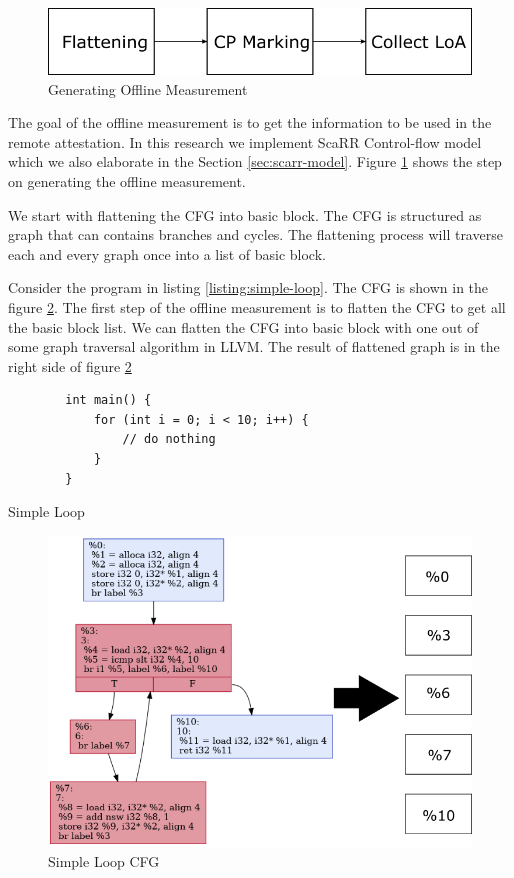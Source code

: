 \begin{figure}[htbp]
\centerline{\includegraphics[scale=.75]{Figures/04/scarr-overview.png}}
\caption{Generating Offline Measurement}
\label{fig:scarr-overview}
\end{figure}

The goal of the offline measurement is to get the information to be used in the
remote attestation. In this research we implement ScaRR Control-flow model
\cite{toffaliniScaRRScalableRuntime2019} which we also elaborate in the Section
\ref{sec:scarr-model}. Figure \ref{fig:scarr-overview} shows the step on
generating the offline measurement.

We start with flattening the CFG into basic block. The CFG is structured as
graph that can contains branches and cycles. The flattening process will
traverse each and every graph once into a list of basic block. 

Consider the program in listing \ref{listing:simple-loop}. The CFG is shown in
the figure \ref{fig:simple-loop-cfg}. The first step of the offline measurement
is to flatten the CFG to get all the basic block list. We can flatten the CFG
into basic block with one out of some graph traversal algorithm in LLVM. The
result of flattened graph is in the right side of figure
\ref{fig:simple-loop-cfg}

\begin{listing}[htbp]
    \begin{verbatim}
        int main() {
            for (int i = 0; i < 10; i++) {
                // do nothing
            }
        }
    \end{verbatim}
    \caption{Simple Loop}    
    \label{listing:simple-loop}
\end{listing}

\begin{figure}[htbp]
\centerline{\includegraphics[scale=.70]{Figures/04/flatten-cfg.png}}
\caption{Simple Loop CFG}
\label{fig:simple-loop-cfg}
\end{figure}


